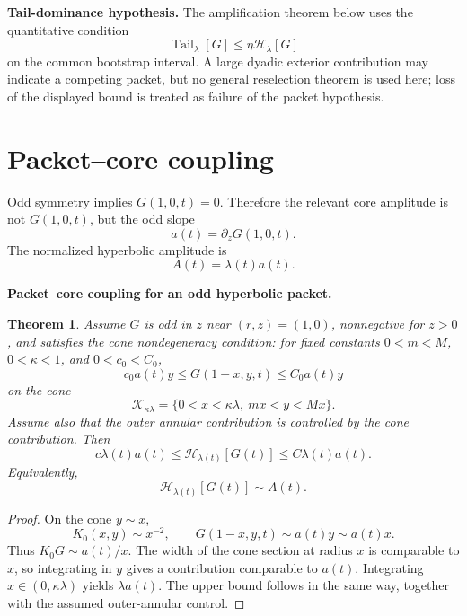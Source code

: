 \documentclass[11pt]{amsart}
\newtheorem{theorem}{Theorem}[section]
\begin{document}
\medskip
\noindent\textbf{Tail-dominance hypothesis.}
The amplification theorem below uses the quantitative condition
\[
\operatorname{Tail}_\lambda[G]\le\eta\mathcal H_\lambda[G]
\]
on the common bootstrap interval.  A large dyadic exterior contribution may
indicate a competing packet, but no general reselection theorem is used here;
loss of the displayed bound is treated as failure of the packet hypothesis.

\section{Packet--core coupling}

Odd symmetry implies \(G(1,0,t)=0\).  Therefore the relevant core amplitude is not \(G(1,0,t)\), but the odd slope
\begin{equation}\label{eq:a_def}
a(t)=\partial_zG(1,0,t).
\end{equation}
The normalized hyperbolic amplitude is
\begin{equation}\label{eq:A_def}
A(t)=\lambda(t)a(t).
\end{equation}

\medskip
\noindent\textbf{Packet--core coupling for an odd hyperbolic packet.}
\begin{theorem}\label{thm:packet_core}
Assume \(G\) is odd in \(z\) near \((r,z)=(1,0)\), nonnegative for \(z>0\), and satisfies the cone nondegeneracy condition: for fixed constants \(0<m<M\), \(0<\kappa<1\), and \(0<c_0<C_0\),
\begin{equation}\label{eq:cone_nonhollow}
c_0a(t)y
\le
G(1-x,y,t)
\le
C_0a(t)y
\end{equation}
on the cone
\[
\mathcal K_{\kappa\lambda}=\{0<x<\kappa\lambda,
\ mx<y<Mx\}.
\]
Assume also that the outer annular contribution is controlled by the cone contribution.  Then
\begin{equation}\label{eq:packet_core_coupling}
c\lambda(t)a(t)
\le
\mathcal H_{\lambda(t)}[G(t)]
\le
C\lambda(t)a(t).
\end{equation}
Equivalently,
\[
\mathcal H_{\lambda(t)}[G(t)]\sim A(t).
\]
\end{theorem}

\begin{proof}
On the cone \(y\sim x\),
\[
K_0(x,y)\sim x^{-2},
\qquad
G(1-x,y,t)\sim a(t)y\sim a(t)x.
\]
Thus \(K_0G\sim a(t)/x\).  The width of the cone section at radius \(x\) is comparable to \(x\), so integrating in \(y\) gives a contribution comparable to \(a(t)\).  Integrating \(x\in(0,\kappa\lambda)\) yields \(\lambda a(t)\).  The upper bound follows in the same way, together with the assumed outer-annular control.
\end{proof}
\end{document}
